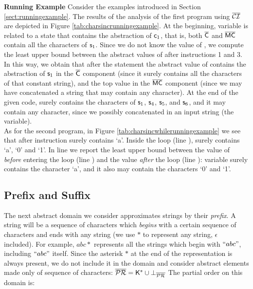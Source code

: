 \documentclass[orivec]{llncs}
\begin{document}
\noindent \textbf{Running Example} Consider the examples introduced in Section \ref{sect:runningexample}. The results of the analysis of the first program using $\mathsf{\overline{\mathsf{\mathcal{CI}}}}$ are depicted in Figure \ref{tab:charsincrunningexample}. At the beginning, variable  is related to a state that contains the abstraction of $\mathsf{c}_1$, that is, both $\mathsf{\overline{C}}$ and $\mathsf{\overline{MC}}$ contain all the characters of $\mathsf{s}_1$. Since we do not know the value of , we compute the least upper bound between the abstract values of  after instructions 1 and 3. In this way, we obtain that after the  statement the abstract value of  contains the abstraction of $\mathsf{s}_1$ in the $\mathsf{\overline{C}}$ component (since it surely contains all the characters of that constant string), and the top value in the $\mathsf{\overline{MC}}$ component (since we may have concatenated a string that may contain any character). At the end of the given code,  surely contains the characters of $\mathsf{s}_1$, $\mathsf{s}_4$, $\mathsf{s}_5$, and $\mathsf{s}_6$, and it may contain any character, since we possibly concatenated in  an input string (the  variable). \\
As for the second program, in Figure \ref{tab:charsincwhilerunningexample} we see that after instruction   surely contains `a'. Inside the loop (line ),  surely contains `a', `0' and `1'. In line  we report the least upper bound between the value of  \textit{before} entering the loop (line ) and the value \textit{after} the loop (line ):  variable  surely contains the character `a', and it also may contain the characters `0' and `1'.

 
 
\subsection{Prefix and Suffix}
 
The next abstract domain we consider approximates strings by their \emph{prefix}. A string will be a sequence of characters which \textit{begins} with a certain sequence of characters and ends with any string (we use $*$ to represent any string, $\epsilon$ included). For example, $abc*$ represents all the strings which begin with $``abc"$, including $``abc"$ itself. Since the asterisk $*$ at the end of the representation is always present, we do not include it in the domain and consider abstract elements made only of sequence of characters: $\mathsf{\overline{\mathsf{\mathcal{PR}}}} = \mathsf{K}^* \cup \bot_{\mathsf{\overline{\mathsf{\mathcal{PR}}}}}$
The partial order on this domain is: 
\end{document}

